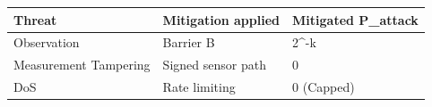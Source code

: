 \begin{tabular}{lll}
\toprule
Threat & Mitigation applied & Mitigated P_attack \\
\midrule
Observation & Barrier B & 2^-k \\
Measurement Tampering & Signed sensor path & 0 \\
DoS & Rate limiting & 0 (Capped) \\
\bottomrule
\end{tabular}
